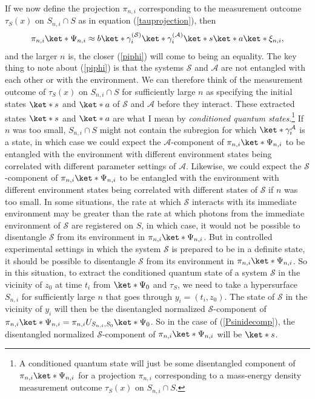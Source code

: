 \documentclass[12pt]{report}
\begin{document}
If we now define the projection $\pi_{n,i}$ corresponding to the measurement outcome  $\tau_S(x)$ on $S_{n,i}\cap S$ as in equation (\ref{tauprojection}), then
\begin{equation}\label{piphi}
	\pi_{n,i}\ket*{\Psi_{n,i}}\approx b\ket*{\gamma_i^{(\mathcal{S})}}\ket*{\gamma_i^{(\mathcal{A})}}\ket*{s}\ket*{a}\ket*{\xi_{n,i}},
\end{equation}
and the larger $n$ is, the closer (\ref{piphi}) will come to being an equality. The key thing to note about (\ref{piphi}) is that the systems $\mathcal{S}$ and $\mathcal{A}$ are not entangled with each other or with the environment.  We can therefore think of the measurement outcome of $\tau_S(x)$ on $S_{n,i}\cap S$ for sufficiently large $n$ as specifying the initial states $\ket*{s}$ and $\ket*{a}$ of   $\mathcal{S}$ and $\mathcal{A}$ before they interact. These extracted states $\ket*{s}$ and $\ket*{a}$ are what I mean by \emph{conditioned quantum states}.\footnote{A conditioned quantum state will just be some disentangled component of $\pi_{n,i}\ket*{\Psi_{n,i}}$ for a projection $\pi_{n,i}$ corresponding to a mass-energy density measurement outcome $\tau_S(x)$ on $S_{n,i}\cap S$.} If $n$ was too small, $S_{n,i}\cap S$ might not contain the subregion for which $\ket*{\gamma_i^{\mathcal{A}}}$ is a state, in which case we could expect the $\mathcal{A}$-component of $\pi_{n,i}\ket*{\Psi_{n,i}}$ to be entangled with the environment with different environment states being correlated with different parameter settings of $\mathcal{A}$. Likewise, we could expect the $\mathcal{S}$-component of $\pi_{n,i}\ket*{\Psi_{n,i}}$ to be entangled with  the environment with different environment states being correlated with different states of $\mathcal{S}$ if $n$ was too small. In some situations, the rate at which $\mathcal{S}$ interacts with its immediate environment may be greater than the rate at which photons from the immediate environment of $\mathcal{S}$ are registered on $S$, in which case, it would not be possible to disentangle $\mathcal{S}$ from its environment in $\pi_{n,i}\ket*{\Psi_{n,i}}$. But in controlled experimental settings in which the system $\mathcal{S}$ is prepared to be in a definite state, it should be possible to disentangle $\mathcal{S}$ from its environment in $\pi_{n,i}\ket*{\Psi_{n,i}}$. So in this situation, to extract the conditioned quantum state of a system $\mathcal{S}$ in the vicinity of $z_0$ at time $t_i$ from $\ket*{\Psi_0}$ and $\tau_S$, we need to take a hypersurface $S_{n,i}$ for sufficiently large $n$ that goes through $y_i=(t_i, z_0)$. The state of $\mathcal{S}$ in the vicinity of $y_i$ will then be the disentangled normalized $\mathcal{S}$-component of $\pi_{n,i}\ket*{\Psi_{n,i}}=\pi_{n,i}U_{S_{n,i},S_0}\ket*{\Psi_0}$. So in the case of (\ref{Psinidecomp}), the disentangled normalized $\mathcal{S}$-component of $\pi_{n,i}\ket*{\Psi_{n,i}}$ will be $\ket*{s}$.
\end{document}
